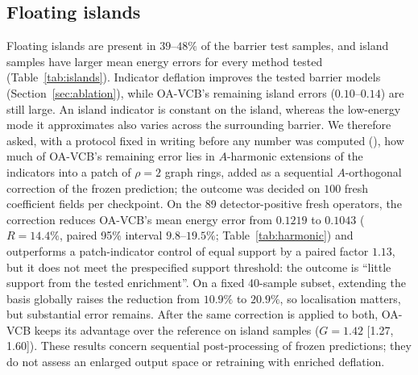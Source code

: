 \subsection{Floating islands}\label{sec:islands}
Floating islands are present in $39$--$48\%$ of the barrier test samples, and island samples have larger mean energy errors
for every method tested (Table~\ref{tab:islands}). Indicator deflation improves the tested barrier models
(Section~\ref{sec:ablation}), while OA-VCB's remaining island errors ($0.10$--$0.14$) are still large. An island indicator is
constant on the island, whereas the low-energy mode it approximates also varies across the surrounding barrier. We therefore
asked, with a protocol fixed in writing before any number was computed (), how much of OA-VCB's remaining
error lies in $A$-harmonic extensions of the indicators into a patch of $\rho = 2$ graph rings, added as a sequential
$A$-orthogonal correction of the frozen prediction; the outcome was decided on $100$ fresh coefficient fields per checkpoint.
On the 89 detector-positive fresh operators, the correction reduces OA-VCB's mean energy error from $0.1219$ to $0.1043$
($R = 14.4\%$, paired 95\% interval $9.8$--$19.5\%$; Table~\ref{tab:harmonic}) and outperforms a patch-indicator control of
equal support by a paired factor $1.13$, but it does not meet the prespecified support threshold: the outcome is ``little
support from the tested enrichment''. On a fixed 40-sample subset, extending the basis globally raises the reduction from
$10.9\%$ to $20.9\%$, so localisation matters, but substantial error remains. After the same correction is applied to both,
OA-VCB keeps its advantage over the reference on island samples ($G = 1.42$ [1.27, 1.60]). These results concern sequential
post-processing of frozen predictions; they do not assess an enlarged output space or retraining with enriched deflation.

